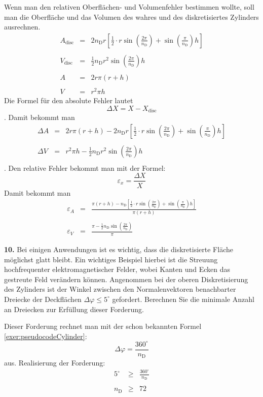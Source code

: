 \documentclass[Protokollheft.tex]{subfiles}
\begin{document}
	Wenn man den relativen Oberflächen- und Volumenfehler bestimmen wollte, soll man die Oberfläche und das Volumen des wahres und des diskretisiertes Zylinders ausrechnen.
	\begin{eqnarray*}
		A_\text{disc}&=&2n_\text{D}r\left[ \frac12 \cdot r \sin\left(\frac{2 \pi}{n_\text{D}}\right)+ \sin\left(\frac{\pi}{n_\text{D}}\right)h  \right]\\
		\\
		V_\text{disc}&=&\frac12 n_\text{D} r^2 \sin\left(\frac{ 2\pi}{n_\text{D}}\right)h\\
		\\
		A&=&2 r \pi (r+h)\\
		\\
		V&=&r^2\pi h
	\end{eqnarray*}
	Die Formel für den absolute Fehler lautet\\
	$$\Delta X = X- X_\text{disc}$$.
	Damit bekommt man
	\begin{eqnarray*}
		\Delta A&=&2 r \pi (r+h) -2n_\text{D}r\left[ \frac12 \cdot r \sin\left(\frac{2 \pi}{n_\text{D}}\right)+ \sin\left(\frac{\pi}{n_\text{D}}\right)h  \right]\\
		\\
		\Delta V&=&r^2\pi h -\frac12 n_\text{D} r^2 \sin\left(\frac{ 2\pi}{n_\text{D}}\right)h\\
	\end{eqnarray*}.
	Den relative Fehler bekommt man mit der Formel:
	$$\varepsilon_{x}=\frac{\Delta X}{X}$$
	Damit bekommt man
	\begin{eqnarray*}
		\varepsilon_{A}&=&\frac{ \pi (r+h) -n_\text{D}\left[ \frac12 \cdot r \sin\left(\frac{2 \pi}{n_\text{D}}\right)+ \sin\left(\frac{\pi}{n_\text{D}}\right)h  \right]}{\pi (r+h)}\\
		\\
		\varepsilon_{V}&=&\frac{\pi  -\frac12 n_\text{D}  \sin\left(\frac{ 2\pi}{n_\text{D}}\right)}{\pi}
	\end{eqnarray*}
	\begin{framed}
		\noindent \textbf{10.} Bei einigen Anwendungen ist es wichtig, dass die diskretisierte Fläche möglichst glatt bleibt. Ein
		wichtiges Beispiel hierbei ist die Streuung hochfrequenter elektromagnetischer Felder, wobei
		Kanten und Ecken das gestreute Feld verändern können. Angenommen bei der oberen
		Diskretisierung des Zylinders ist der Winkel zwischen den Normalenvektoren benachbarter Dreiecke der Deckflächen $\Delta \varphi \leq 5^{\circ}$ gefordert.
		Berechnen Sie die minimale Anzahl an Dreiecken zur Erfüllung dieser Forderung.\label{exer:smoothArea}
	\end{framed}
	\noindent
	Dieser Forderung rechnet man mit der schon bekannten Formel
	\ref{exer:pseudocodeCylinder}:
	$$\Delta \varphi = \frac{360^\circ}{n_\text{D}}$$ aus. 
	Realisierung der Forderung:
	\begin{eqnarray*}
		5^{\circ} &\geq& \frac{360^\circ}{n_\text{D}}\\
		\\
		n_\text{D} &\geq& 72
	\end{eqnarray*}
	
\end{document}
